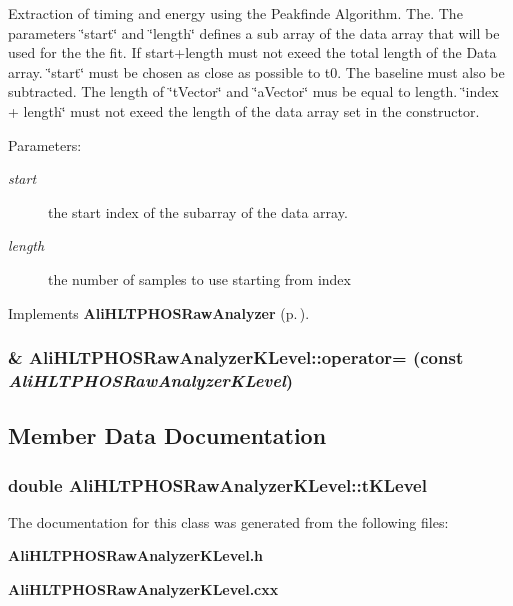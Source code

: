 Extraction of timing and energy using the Peakfinde Algorithm. The. The parameters \char`\"{}start\char`\"{} and \char`\"{}length\char`\"{} defines a sub array of the data array that will be used for the the fit. If start+length must not exeed the total length of the Data array. \char`\"{}start\char`\"{} must be chosen as close as possible to t0. The baseline must also be subtracted. The length of \char`\"{}t\-Vector\char`\"{} and \char`\"{}a\-Vector\char`\"{} mus be equal to length. \char`\"{}index + length\char`\"{} must not exeed the length of the data array set in the constructor. \begin{Desc}
\item[Parameters:]
\begin{description}
\item[{\em start}]the start index of the subarray of the data array. \item[{\em length}]the number of samples to use starting from index \end{description}
\end{Desc}


Implements {\bf Ali\-HLTPHOSRaw\-Analyzer} {\rm (p.\,\pageref{classAliHLTPHOSRawAnalyzer_a14})}.
\subsubsection{\& Ali\-HLTPHOSRaw\-Analyzer\-KLevel::operator= (const  {\em Ali\-HLTPHOSRaw\-Analyzer\-KLevel})\hspace{0.3cm}{\tt  [inline]}}\label{classAliHLTPHOSRawAnalyzerKLevel_a2}




\subsection{Member Data Documentation}
\subsubsection{\setlength{\rightskip}{0pt plus 5cm}double {\bf Ali\-HLTPHOSRaw\-Analyzer\-KLevel::t\-KLevel}\hspace{0.3cm}{\tt  [private]}}\label{classAliHLTPHOSRawAnalyzerKLevel_r0}




The documentation for this class was generated from the following files:\begin{CompactItemize}
\item 
{\bf Ali\-HLTPHOSRaw\-Analyzer\-KLevel.h}\item 
{\bf Ali\-HLTPHOSRaw\-Analyzer\-KLevel.cxx}\end{CompactItemize}
